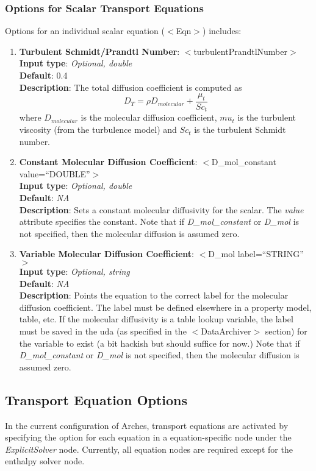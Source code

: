\subsubsection{Options for Scalar Transport Equations} 
%
Options for an individual scalar equation ($<$Eqn$>$) includes:   
\begin{enumerate}
%
\item {\bf Turbulent Schmidt/Prandtl Number}: $<$turbulentPrandtlNumber$>$ \\
{\bf Input type}: {\it Optional, double} \\
{\bf Default}: 0.4 \\
{\bf Description}: The total diffusion coefficient is computed as 
\[
D_T = \rho D_{molecular} + \frac{\mu_t}{Sc_t}
\]
where $D_{molecular}$ is the molecular diffusion coefficient, $mu_t$ is the turbulent viscosity (from the turbulence model) and $Sc_t$ is the turbulent Schmidt number.  
\item {\bf Constant Molecular Diffusion Coefficient}: $<$D\_mol\_constant value=``DOUBLE''$>$ \\
{\bf Input type}: {\it Optional, double} \\
{\bf Default}: {\it NA} \\
{\bf Description}: Sets a constant molecular diffusivity for the scalar.  The {\it value} attribute specifies the constant.  Note that if {\it D\_mol\_constant} or {\it D\_mol} is not specified, then the molecular diffusion is assumed zero. 
\item {\bf Variable Molecular Diffusion Coefficient}: $<$D\_mol label=``STRING''$>$ \\
{\bf Input type}: {\it Optional, string} \\
{\bf Default}: {\it NA} \\
{\bf Description}: Points the equation to the correct label for the molecular diffusion coefficient.  The label must be defined elsewhere in a property model, table, etc.  If the molecular diffusivity is a table lookup variable, the label must be saved in the uda (as specified in the $<$DataArchiver$>$ section) for the variable to exist (a bit hackish but should suffice for now.) Note that if {\it D\_mol\_constant} or {\it D\_mol} is not specified, then the molecular diffusion is assumed zero.
%
\end{enumerate}

\subsection{Transport Equation Options}\label{Sec:Eqns_options}
In the current configuration of Arches, transport equations are activated by specifying the option for each equation in a equation-specific node under the {\it ExplicitSolver} node.  Currently, all equation nodes are required except for the enthalpy solver node.  


